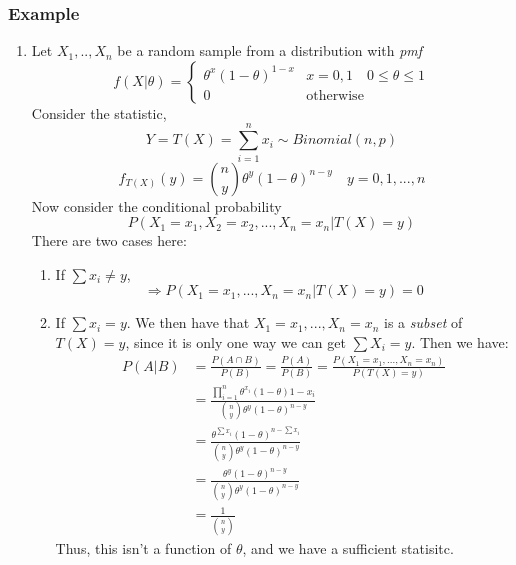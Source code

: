 \documentclass{article}
\begin{document}
\subsubsection*{Example}
\begin{enumerate}
    \item Let $X_1,..,X_n$ be a random sample from a distribution with \textit{pmf}
    \begin{equation*}
        f(X|\theta) = \begin{cases}
            \theta^x(1-\theta)^{1-x} & x = 0,1 \quad 0 \leq \theta \leq 1\\
            0 & \text{otherwise}
        \end{cases}
    \end{equation*}
    Consider the statistic,
    \begin{equation*}
        Y=T(X) = \sum_{i=1}^n x_i \sim Binomial(n,p)
    \end{equation*}
    \begin{equation*}
        f_{T(X)} (y) = \binom{n}{y}\theta^y (1-\theta)^{n-y} \quad y=0,1,...,n
    \end{equation*}
    Now consider the conditional probability
    \begin{equation*}
        P(X_1=x_1, X_2=x_2,...,X_n=x_n|T(X) = y)
    \end{equation*}
    There are two cases here:
    \begin{enumerate}
        \item If $\sum x_i \neq y$,
        \begin{equation*}
        \Rightarrow    P(X_1=x_1,...,X_n=x_n|T(X)=y) = 0
        \end{equation*}
        \item If $\sum x_i = y$. We then have that $X_1 = x_1, ...,X_n = x_n$ is a \textit{subset} of $T(X)=y$, since it is only one way we can get $\sum X_i = y$. Then we have:
        \begin{equation*}
            \begin{split}
                P(A|B) &= \frac{P(A\cap B)}{P(B)} = \frac{P(A)}{P(B)} = \frac{P(X_1=x_1,...,X_n=x_n)}{P(T(X)=y)}\\
                &= \frac{\prod_{i=1}^n \theta^{x_i}(1-\theta){1-x_i}}{\binom{n}{y}\theta^y (1-\theta)^{n-y}}\\
                &= \frac{\theta^{\sum x_i}(1-\theta)^{n-\sum x_i}}{\binom{n}{y}\theta^{y}(1-\theta)^{n-y}}\\
                &= \frac{\theta^{y}(1-\theta)^{n-y}}{\binom{n}{y}\theta^{y}(1-\theta)^{n-y}}\\
                &= \frac{1}{\binom{n}{y}}
            \end{split}
        \end{equation*}
        Thus, this isn't a function of $\theta$, and we have a sufficient statisitc.
    \end{enumerate}
\end{enumerate}
\end{document}
